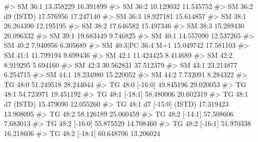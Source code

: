 \documentclass[
  letterpaper,
  DIV=11,
  numbers=noendperiod]{scrreprt}
\newenvironment{Shaded}{\begin{snugshade}}{\end{snugshade}}
\newcommand{\CommentTok}[1]{\textcolor[rgb]{0.37,0.37,0.37}{#1}}
\begin{document}
\begin{Shaded}
\begin{Highlighting}[]
\CommentTok{\#\textgreater{} SM 36:1                                   13.358229 16.391899}
\CommentTok{\#\textgreater{} SM 36:2                                   10.129032 11.545752}
\CommentTok{\#\textgreater{} SM 36:2 d9 (ISTD)                         17.576956 17.247140}
\CommentTok{\#\textgreater{} SM 36:3                                   18.927181 15.614857}
\CommentTok{\#\textgreater{} SM 38:1                                   26.264390 12.195195}
\CommentTok{\#\textgreater{} SM 38:2                                   17.646582 15.497346}
\CommentTok{\#\textgreater{} SM 38:3                                   15.289430 20.096332}
\CommentTok{\#\textgreater{} SM 39:1                                   19.683449  9.746825}
\CommentTok{\#\textgreater{} SM 40:1                                   14.557090 12.537265}
\CommentTok{\#\textgreater{} SM 40:2                                    7.940956  6.305689}
\CommentTok{\#\textgreater{} SM 40:3|PC 36:4 M+1                       15.049742 17.581103}
\CommentTok{\#\textgreater{} SM 41:1                                   11.799194  9.699436}
\CommentTok{\#\textgreater{} SM 42:1                                   11.424425  8.414689}
\CommentTok{\#\textgreater{} SM 42:2                                    8.919295  5.694160}
\CommentTok{\#\textgreater{} SM 42:3                                   30.562831 37.512379}
\CommentTok{\#\textgreater{} SM 43:1                                   23.214877  6.254715}
\CommentTok{\#\textgreater{} SM 44:1                                   18.234980 15.220052}
\CommentTok{\#\textgreater{} SM 44:2                                    7.732091  8.284322}
\CommentTok{\#\textgreater{} TG 48:0                                   51.249518 28.244044}
\CommentTok{\#\textgreater{} TG 48:0 [{-}16:0]                           49.845196 29.020053}
\CommentTok{\#\textgreater{} TG 48:1                                   54.723971 19.451192}
\CommentTok{\#\textgreater{} TG 48:1 [{-}18:1]                           58.480006 20.602319}
\CommentTok{\#\textgreater{} TG 48:1 d7 (ISTD)                         15.479090 12.055260}
\CommentTok{\#\textgreater{} TG 48:1 d7 [{-}15:0] (ISTD)                 17.319423 13.908095}
\CommentTok{\#\textgreater{} TG 48:2                                   58.126189 25.060459}
\CommentTok{\#\textgreater{} TG 48:2 [{-}14:1]                           57.508606  7.683013}
\CommentTok{\#\textgreater{} TG 48:2 [{-}16:0]                           55.875529 14.708460}
\CommentTok{\#\textgreater{} TG 48:2 [{-}16:1]                           51.970338 16.218606}
\CommentTok{\#\textgreater{} TG 48:2 [{-}18:1]                           60.648706 13.206024}

\end{Highlighting}
\end{Shaded}
\end{document}
